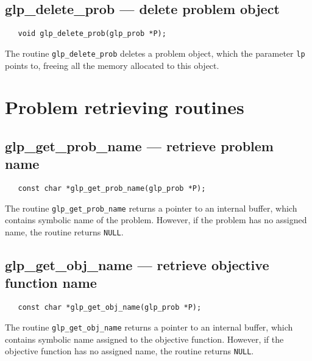 \newpage

\subsection{glp\_delete\_prob --- delete problem object}

\synopsis

\begin{verbatim}
   void glp_delete_prob(glp_prob *P);
\end{verbatim}

\description

The routine \verb|glp_delete_prob| deletes a problem object, which the
parameter \verb|lp| points to, freeing all the memory allocated to this
object.


\newpage

\section{Problem retrieving routines}

\subsection{glp\_get\_prob\_name --- retrieve problem name}

\synopsis

\begin{verbatim}
   const char *glp_get_prob_name(glp_prob *P);
\end{verbatim}

\returns

The routine \verb|glp_get_prob_name| returns a pointer to an internal
buffer, which contains symbolic name of the problem. However, if the
problem has no assigned name, the routine returns \verb|NULL|.

\subsection{glp\_get\_obj\_name --- retrieve objective function name}

\synopsis

\begin{verbatim}
   const char *glp_get_obj_name(glp_prob *P);
\end{verbatim}

\returns

The routine \verb|glp_get_obj_name| returns a pointer to an internal
buffer, which contains symbolic name assigned to the objective
function. However, if the objective function has no assigned name, the
routine returns \verb|NULL|.

